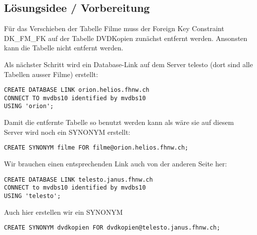 \documentclass[11pt,a4paper,parskip=half]{scrartcl}
\begin{document}
\subsection{Lösungsidee / Vorbereitung}
Für das Verschieben der Tabelle \glqq{}Filme\grqq{} muss der Foreign Key Constraint \glqq{}DK\_FM\_FK\grqq{} auf der Tabelle \glqq{}DVDKopien\grqq{} zunächst entfernt werden. Ansonsten kann die Tabelle nicht entfernt werden.

Als nächster Schritt wird ein Database-Link auf dem Server telesto (dort sind alle Tabellen ausser Filme) erstellt:

\begin{lstlisting}
CREATE DATABASE LINK orion.helios.fhnw.ch
CONNECT TO mvdbs10 identified by mvdbs10
USING 'orion';
\end{lstlisting}

Damit die entfernte Tabelle so benutzt werden kann als wäre sie auf diesem Server wird noch ein SYNONYM erstellt:
\begin{lstlisting}
CREATE SYNONYM filme FOR filme@orion.helios.fhnw.ch;
\end{lstlisting}

Wir brauchen einen entsprechenden Link auch von der anderen Seite her:

\begin{lstlisting}
CREATE DATABASE LINK telesto.janus.fhnw.ch
CONNECT to mvdbs10 identified by mvdbs10
USING 'telesto';
\end{lstlisting}

Auch hier erstellen wir ein SYNONYM
\begin{lstlisting}
CREATE SYNONYM dvdkopien FOR dvdkopien@telesto.janus.fhnw.ch;
\end{lstlisting}
\end{document}
